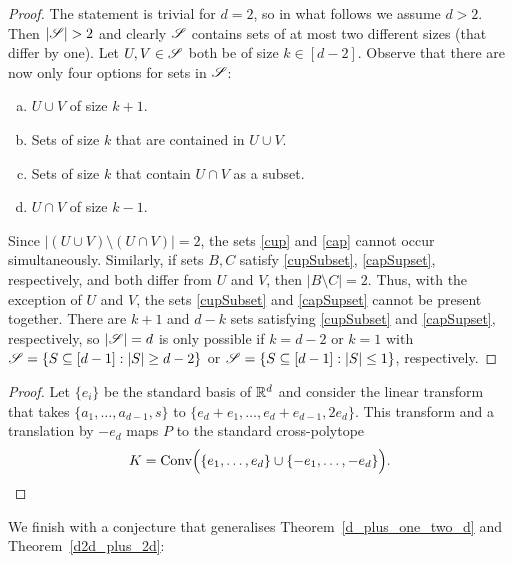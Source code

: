 \smallDifferenceLemma*
\begin{proof}
    The  statement is trivial for $d=2$, so in what follows we assume $d>2$. Then $|\sss|>2$ and clearly ${\mathscr{S}}$ contains sets of at most two different sizes (that differ by one). Let $U, V \in {\mathscr{S}}$ both be of size $k\in [d-2]$. Observe that there are now only four options for sets in ${\mathscr{S}}$:
    \begin{enumerate}[(a)]
        \item $U \cup V$ of size $k+1$. \label{cup}
        \item Sets of size $k$ that are contained in $U \cup V$. \label{cupSubset}
        \item Sets of size $k$ that contain $U\cap V$ as a subset. \label{capSupset}
        \item $U \cap V$ of size $k-1$. \label{cap}
    \end{enumerate}
Since $|(U \cup V)\setminus (U \cap V)|=2$, the sets \ref{cup} and \ref{cap} cannot occur simultaneously. Similarly, if sets $B, C$ satisfy \ref{cupSubset}, \ref{capSupset}, respectively, and both differ from $U$ and $V$, then $|B\setminus C|=2$. Thus, with the exception of $U$ and $V$, the sets \ref{cupSubset} and \ref{capSupset} cannot be present together. There are $k+1$ and $d-k$ sets satisfying \ref{cupSubset} and \ref{capSupset}, respectively, so $|{\mathscr{S}}|=d$ is only possible if $k=d-2$ or $k=1$ with ${\mathscr{S}} = \{S\subseteq[d-1]: |S| \geq d-2\}$ or ${\mathscr{S}} = \{S\subseteq[d-1]: |S| \leq 1\}$, respectively. 
\end{proof}

\crossPolyRepresentation*
\begin{proof}
    Let $\{e_i\}$ be the standard basis of ${\mathbb{R}}^d$ and consider the linear transform that takes $\{a_1, \ldots, a_{d-1}, s\}$ to $\{e_d + e_1, \ldots, e_d + e_{d-1}, 2e_d\}$. This transform and a translation by $-e_d$ maps $P$ to the standard cross-polytope 
    \[
        K = \operatorname{Conv}\Bigl(\{e_1, \ldots, e_d\}\cup\{-e_1, \ldots, -e_d\}\Bigr).
    \]
\end{proof}

\noindent We finish with a conjecture that generalises Theorem~\ref{d_plus_one_two_d} and Theorem~\ref{d2d_plus_2d}:


